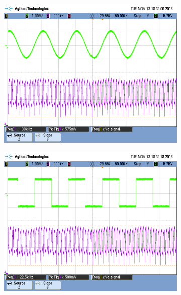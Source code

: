 \documentclass[../../tc_tp6_main.tex]{subfiles}
\begin{document}
\begin{figure}[H]	%
	\centering
	\begin{subfigure}[t]{0.45\textwidth}
		\centering
		\includegraphics[width=\textwidth]{figures/scope_31.png}
		\caption{}
	\end{subfigure}%
	\hfill%
	\begin{subfigure}[t]{0.45\textwidth}
		\centering
		\includegraphics[width=\textwidth]{figures/scope_32.png}
		\caption{}
	\end{subfigure}
		\hfill%
	\begin{subfigure}[t]{0.45\textwidth}

\end{subfigure}
\end{figure}
\end{document}
